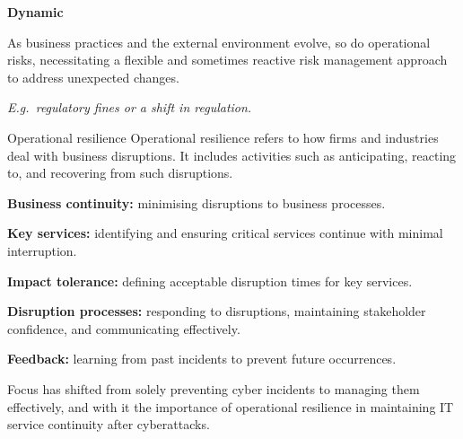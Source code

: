 \begin{orkeybox}
{\sffamily\bfseries\fontsize{9.4}{11}\selectfont\color{navy}Dynamic}\par
\vspace{2pt}
As business practices and the external environment evolve, so do operational
risks, necessitating a flexible and sometimes reactive risk management approach
to address unexpected changes.\par
\vspace{3pt}
{\fontsize{9}{11}\selectfont\color{rust}\itshape E.g.\ regulatory fines or a
shift in regulation.}
\end{orkeybox}


\begin{ordefbox}{Operational resilience}
Operational resilience refers to how firms and industries deal with business
disruptions. It includes activities such as anticipating, reacting to, and
recovering from such disruptions.
\end{ordefbox}


\begin{checks}
\item \textbf{Business continuity:} minimising disruptions to business processes.
\item \textbf{Key services:} identifying and ensuring critical services continue
with minimal interruption.
\item \textbf{Impact tolerance:} defining acceptable disruption times for key
services.
\item \textbf{Disruption processes:} responding to disruptions, maintaining
stakeholder confidence, and communicating effectively.
\item \textbf{Feedback:} learning from past incidents to prevent future
occurrences.
\end{checks}


Focus has shifted from solely preventing cyber incidents to managing them
effectively, and with it the importance of operational resilience in maintaining
IT service continuity after cyberattacks.

